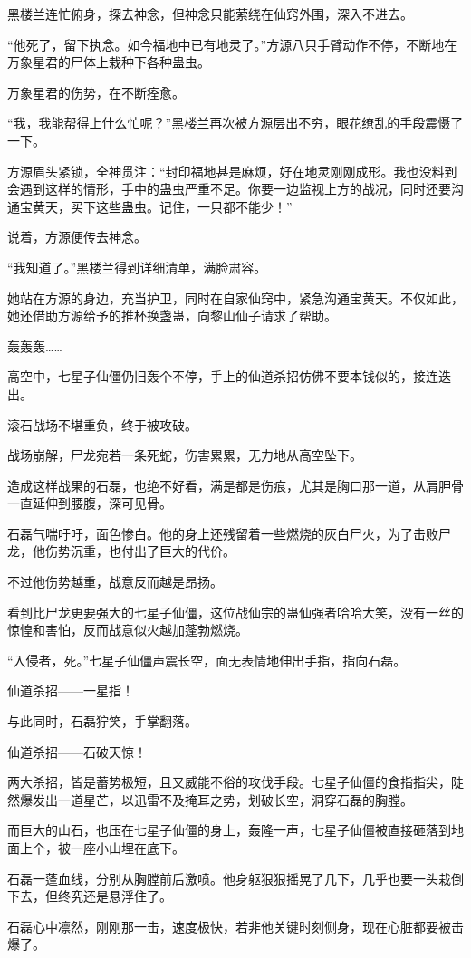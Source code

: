 \begin{this_body}
黑楼兰连忙俯身，探去神念，但神念只能萦绕在仙窍外围，深入不进去。

“他死了，留下执念。如今福地中已有地灵了。”方源八只手臂动作不停，不断地在万象星君的尸体上栽种下各种蛊虫。

万象星君的伤势，在不断痊愈。

“我，我能帮得上什么忙呢？”黑楼兰再次被方源层出不穷，眼花缭乱的手段震慑了一下。

方源眉头紧锁，全神贯注：“封印福地甚是麻烦，好在地灵刚刚成形。我也没料到会遇到这样的情形，手中的蛊虫严重不足。你要一边监视上方的战况，同时还要沟通宝黄天，买下这些蛊虫。记住，一只都不能少！”

说着，方源便传去神念。

“我知道了。”黑楼兰得到详细清单，满脸肃容。

她站在方源的身边，充当护卫，同时在自家仙窍中，紧急沟通宝黄天。不仅如此，她还借助方源给予的推杯换盏蛊，向黎山仙子请求了帮助。

轰轰轰……

高空中，七星子仙僵仍旧轰个不停，手上的仙道杀招仿佛不要本钱似的，接连迭出。

滚石战场不堪重负，终于被攻破。

战场崩解，尸龙宛若一条死蛇，伤害累累，无力地从高空坠下。

造成这样战果的石磊，也绝不好看，满是都是伤痕，尤其是胸口那一道，从肩胛骨一直延伸到腰腹，深可见骨。

石磊气喘吁吁，面色惨白。他的身上还残留着一些燃烧的灰白尸火，为了击败尸龙，他伤势沉重，也付出了巨大的代价。

不过他伤势越重，战意反而越是昂扬。

看到比尸龙更要强大的七星子仙僵，这位战仙宗的蛊仙强者哈哈大笑，没有一丝的惊惶和害怕，反而战意似火越加蓬勃燃烧。

“入侵者，死。”七星子仙僵声震长空，面无表情地伸出手指，指向石磊。

仙道杀招——一星指！

与此同时，石磊狞笑，手掌翻落。

仙道杀招——石破天惊！

两大杀招，皆是蓄势极短，且又威能不俗的攻伐手段。七星子仙僵的食指指尖，陡然爆发出一道星芒，以迅雷不及掩耳之势，划破长空，洞穿石磊的胸膛。

而巨大的山石，也压在七星子仙僵的身上，轰隆一声，七星子仙僵被直接砸落到地面上个，被一座小山埋在底下。

石磊一蓬血线，分别从胸膛前后激喷。他身躯狠狠摇晃了几下，几乎也要一头栽倒下去，但终究还是悬浮住了。

石磊心中凛然，刚刚那一击，速度极快，若非他关键时刻侧身，现在心脏都要被击爆了。


\end{this_body}
